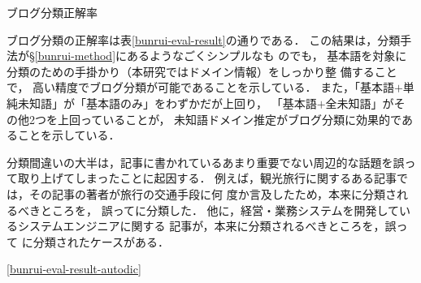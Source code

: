 \documentclass[japanese]{jnlp_1.4}
\newcommand{\revise}[1]{}
\newcommand{\dom}[1]{}
\begin{document}
\begin{table}[b]
\caption{ブログ分類正解率}
\label{bunrui-eval-result}
\begin{center}

\end{center}
\end{table}

ブログ分類の正解率は表\ref{bunrui-eval-result}の通りである．
この結果は，分類手法が\S\ref{bunrui-method}にあるようなごくシンプルなも
のでも，
基本語を対象に分類のための手掛かり（本研究ではドメイン情報）をしっかり整
備することで，
高い精度でブログ分類が可能であることを示している．
また，「基本語$+$単純未知語」が「基本語のみ」をわずかだが上回り，
「基本語$+$全未知語」がその他2つを上回っていることが，
未知語ドメイン推定がブログ分類に効果的であることを示している．


分類間違いの大半は，記事に書かれているあまり重要でない周辺的な話題を誤っ
て取り上げてしまったことに起因する．
例えば，観光旅行に関するある記事では，その記事の著者が旅行の交通手段に何
度か言及したため，本来\dom{レクリエーション}に分類されるべきところを，
誤って\dom{交通}に分類した．
他に，経営・業務システムを開発しているシステムエンジニアに関する
記事が，本来\dom{科学・技術}に分類されるべきところを，誤って
\dom{ビジネス}に分類されたケースがある．

\revise{
手作業修正していない基本語ドメイン辞書を用いた場合のブログ分類結果は表
}
\ref{bunrui-eval-result-autodic}
\revise{
の通りである．
}
\revise{
手作業修正無しの辞書でも正解率が80\%を越えているが，これは本研究の基本語
ドメイン辞書構築手法の精度の高さを示している．
一方，手作業修正を加えた場合に比べたら上位1位で10\%以上正解率が下がった．
これは，正確に手作業修正が行われたことを示しており，本研究の成果である基
本語ドメイン辞書の言語資源としての完成度の高さを示している．
}


\begin{table}[b]
\textwidth
\begin{minipage}{0.45\textwidth}
\label{bunrui-eval-result-autodic}
\begin{center}

\end{center}
\end{minipage}
\hfill
\begin{minipage}{0.45\textwidth}
\label{bunrui-eval-result-wordfreq}
\begin{center}

\end{center}
\end{minipage}
\end{table}
\end{document}
